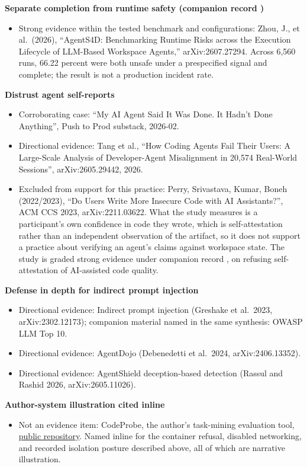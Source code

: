 \textbf{Separate completion from runtime safety (companion record )}

\begin{itemize}
\tightlist
\item
  Strong evidence within the tested benchmark and configurations: Zhou, J., et al.~(2026), ``AgentS4D: Benchmarking Runtime Risks across the Execution Lifecycle of LLM-Based Workspace Agents,'' arXiv:2607.27294. Across 6,560 runs, 66.22 percent were both unsafe under a prespecified signal and complete; the result is not a production incident rate.
\end{itemize}

\textbf{Distrust agent self-reports}

\begin{itemize}
\tightlist
\item
  Corroborating case: ``My AI Agent Said It Was Done. It Hadn't Done Anything'', Push to Prod substack, 2026-02.
\item
  Directional evidence: Tang et al., ``How Coding Agents Fail Their Users: A Large-Scale Analysis of Developer-Agent Misalignment in 20,574 Real-World Sessions'', arXiv:2605.29442, 2026.
\item
  Excluded from support for this practice: Perry, Srivastava, Kumar, Boneh (2022/2023), ``Do Users Write More Insecure Code with AI Assistants?'', ACM CCS 2023, arXiv:2211.03622. What the study measures is a participant's own confidence in code they wrote, which is self-attestation rather than an independent observation of the artifact, so it does not support a practice about verifying an agent's claims against workspace state. The study is graded strong evidence under companion record , on refusing self-attestation of AI-assisted code quality.
\end{itemize}

\textbf{Defense in depth for indirect prompt injection}

\begin{itemize}
\tightlist
\item
  Directional evidence: Indirect prompt injection (Greshake et al.~2023, arXiv:2302.12173); companion material named in the same synthesis: OWASP LLM Top 10.
\item
  Directional evidence: AgentDojo (Debenedetti et al.~2024, arXiv:2406.13352).
\item
  Directional evidence: AgentShield deception-based detection (Rassul and Rashid 2026, arXiv:2605.11026).
\end{itemize}

\textbf{Author-system illustration cited inline}

\begin{itemize}
\tightlist
\item
  Not an evidence item: CodeProbe, the author's task-mining evaluation tool, \href{https://github.com/sjarmak/codeprobe}{public repository}. Named inline for the container refusal, disabled networking, and recorded isolation posture described above, all of which are narrative illustration.
\end{itemize}
